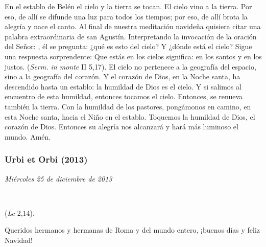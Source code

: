 En el establo de Belén el cielo y la tierra se tocan. El cielo vino a la tierra. Por eso, de allí se difunde una luz para todos los tiempos; por eso, de allí brota la alegría y nace el canto. Al final de nuestra meditación navideña quisiera citar una palabra extraordinaria de san Agustín. Interpretando la invocación de la oración del Señor: , él se pregunta: ¿qué es esto del cielo? Y ¿dónde está el cielo? Sigue una respuesta sorprendente: Que estás en los cielos significa: en los santos y en los justos.  (\emph{Serm. in monte} II 5,17). El cielo no pertenece a la geografía del espacio, sino a la geografía del corazón. Y el corazón de Dios, en la Noche santa, ha descendido hasta un establo: la humildad de Dios es el cielo. Y si salimos al encuentro de esta humildad, entonces tocamos el cielo. Entonces, se renueva también la tierra. Con la humildad de los pastores, pongámonos en camino, en esta Noche santa, hacia el Niño en el establo. Toquemos la humildad de Dios, el corazón de Dios. Entonces su alegría nos alcanzará y hará más luminoso el mundo. Amén.

\subsubsection{Urbi et Orbi (2013)} \emph{Miércoles 25 de diciembre de 2013}


~

\emph{} (\emph{Lc} 2,14).

Queridos hermanos y hermanas de Roma y del mundo entero, ¡buenos días y feliz Navidad!

